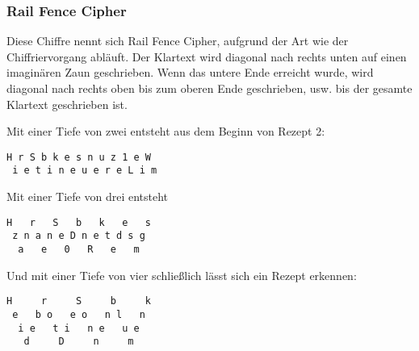 \subsubsection*{Rail Fence Cipher}

Diese Chiffre nennt sich Rail Fence Cipher, aufgrund der Art wie der
Chiffriervorgang abläuft. Der Klartext wird diagonal nach rechts unten auf einen
imaginären Zaun geschrieben. Wenn das untere Ende erreicht wurde, wird diagonal
nach rechts oben bis zum oberen Ende geschrieben, usw. bis der gesamte Klartext
geschrieben ist.

Mit einer Tiefe von zwei entsteht aus dem Beginn von Rezept 2:

\begin{lstlisting}
H r S b k e s n u z 1 e W
 i e t i n e u e r e L i m
\end{lstlisting}

Mit einer Tiefe von drei entsteht

\begin{lstlisting}
H   r   S   b   k   e   s
 z n a n e D n e t d s g
  a   e   0   R   e   m
\end{lstlisting}
Und mit einer Tiefe von vier schließlich lässt sich ein Rezept erkennen:
\begin{lstlisting}
H     r     S     b     k
 e   b o   e o   n l   n
  i e   t i   n e   u e
   d     D     n     m
\end{lstlisting}



